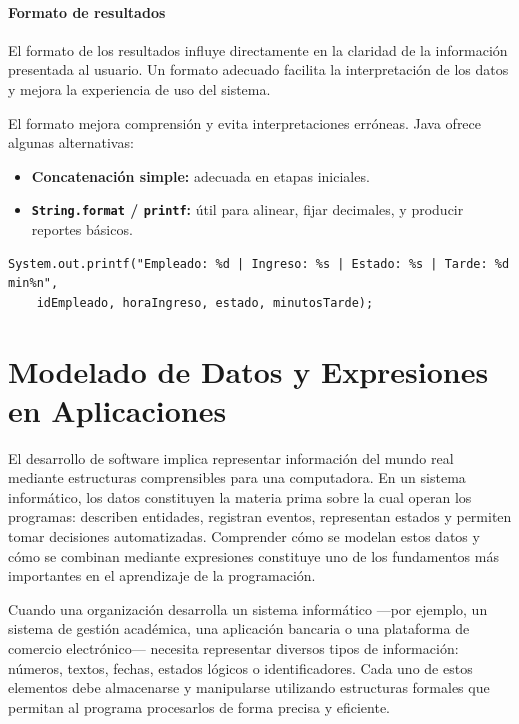 \documentclass[12pt,twoside]{book}
\begin{document}
					\subsubsection{Formato de resultados}
						\noindent
						El formato de los resultados influye directamente en la claridad de la información presentada al usuario. Un formato adecuado facilita la interpretación de los datos y mejora la experiencia de uso del sistema.
						
						El formato mejora comprensión y evita interpretaciones erróneas. Java ofrece algunas alternativas:
						
						\begin{itemize}
							\item \textbf{Concatenación simple:} adecuada en etapas iniciales.
							\item \textbf{\texttt{String.format} / \texttt{printf}:} útil para alinear, fijar decimales, y producir reportes básicos.
						\end{itemize}
						
						\begin{lstlisting}[style=Java,caption={Formato con printf para reportes básicos.},label={lst:FormatoPrintf}]
	System.out.printf("Empleado: %d | Ingreso: %s | Estado: %s | Tarde: %d min%n",
	idEmpleado, horaIngreso, estado, minutosTarde);\end{lstlisting}
						
		\chapter{Modelado de Datos y Expresiones en Aplicaciones}
			\noindent
			El desarrollo de software implica representar información del mundo real mediante estructuras comprensibles para una computadora. En un sistema informático, los datos constituyen la materia prima sobre la cual operan los programas: describen entidades, registran eventos, representan estados y permiten tomar decisiones automatizadas. Comprender cómo se modelan estos datos y cómo se combinan mediante expresiones constituye uno de los fundamentos más importantes en el aprendizaje de la programación.
			
			Cuando una organización desarrolla un sistema informático —por ejemplo, un sistema de gestión académica, una aplicación bancaria o una plataforma de comercio electrónico— necesita representar diversos tipos de información: números, textos, fechas, estados lógicos o identificadores. Cada uno de estos elementos debe almacenarse y manipularse utilizando estructuras formales que permitan al programa procesarlos de forma precisa y eficiente.
			
\end{document}
